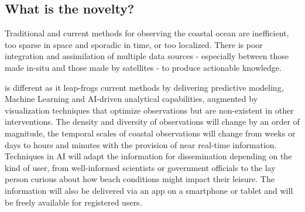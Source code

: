 



\vspace*{-0.2cm}
\subsection{What is the novelty?}

Traditional  and  current  methods  for  observing  the  coastal
ocean  are  inefficient,  too sparse in space and sporadic in time, or
too localized. There is poor integration and assimilation of multiple
data sources - especially between those made in-situ and those made by
satellites - to produce actionable knowledge.


\pro is different as it leap-frogs current methods by delivering
predictive modeling, Machine Learning and AI-driven analytical
capabilities, augmented by visualization techniques that optimize
observations but are non-existent in other interventions. The density
and diversity of observations will change by an order of magnitude,
the temporal scales of coastal observations will change from weeks or
days to hours and minutes with the provision of near real-time
information. Techniques in AI will adapt the information for
dissemination depending on the kind of user, from well-informed
scientists or government officials to the lay person curious about how
beach conditions might impact their leisure. The information will also
be delivered via an app on a smartphone or tablet and will be freely
available for registered users.


